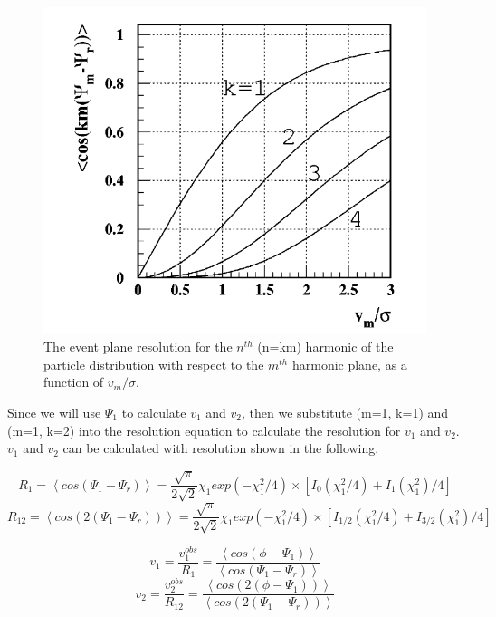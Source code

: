 \begin{figure}[hb]
\centering
\includegraphics[scale=0.6]{chapter2/fig/resolution_vs_nu.png}
\caption{The event plane resolution for the $n^{th}$ (n=km) harmonic of the particle distribution with respect to the $m^{th}$ harmonic plane, as a function of $v_{m}$$/$$\sigma$.}
\label{fig:res_vs_nu} 
\end{figure}

Since we will use $\Psi_{1}$ to calculate $v_{1}$ and $v_{2}$, then we substitute (m=1, k=1) and (m=1, k=2) into the resolution equation to calculate the resolution for $v_{1}$ and $v_{2}$. $v_{1}$ and $v_{2}$ can be calculated with resolution shown in the following.

\begin{equation}
	R_{1} = \left< cos(\Psi_{1}-\Psi_{r}) \right>
	=\frac{\sqrt{\pi}}{2\sqrt{2}}\chi_{1}exp(-\chi_{1}^{2}/4) \times
	[I_{0}(\chi_{1}^{2}/4)+I_{1}(\chi_{1}^{2})/4]
	\label{equ:R1_chi1}
\end{equation}
\begin{equation}
	R_{12} = \left< cos(2(\Psi_{1}-\Psi_{r})) \right>
	=\frac{\sqrt{\pi}}{2\sqrt{2}}\chi_{1}exp(-\chi_{1}^{2}/4) \times
	[I_{1/2}(\chi_{1}^{2}/4)+I_{3/2}(\chi_{1}^{2})/4] 
	\label{equ:R12_chi1}
\end{equation}

\begin{equation}
	v_{1} =\frac{v_{1}^{obs}}{R_{1}} = 
	\frac{\left< cos(\phi-\Psi_{1}) \right>}{\left< cos(\Psi_{1}-\Psi_{r}) \right>}
\end{equation}
\begin{equation}
	v_{2} =\frac{v_{2}^{obs}}{R_{12}} = 
	\frac{\left< cos(2(\phi-\Psi_{1})) \right>}{\left< cos(2(\Psi_{1}-\Psi_{r})) \right>}
\end{equation}

